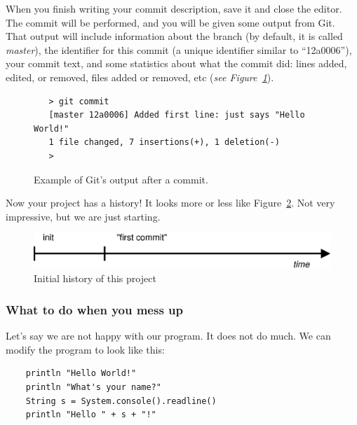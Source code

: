 When you finish writing your commit description, save it and close the
editor. The commit will be performed, and you will be given some
output from Git. That output will include information about the
branch (by default, it is called \emph{master}), the identifier for
this commit (a unique identifier similar to ``12a0006''), 
your commit text, and some 
statistics about what the commit did: lines added, edited, or removed,
files added or removed, etc (\emph{see
  Figure~\ref{fig:git-example-output}}). 

\begin{figure}[htbp!]
  \centering
  \begin{framed}
    \begin{verbatim}
   > git commit
   [master 12a0006] Added first line: just says "Hello World!"
   1 file changed, 7 insertions(+), 1 deletion(-)
   >
   \end{verbatim}
  \end{framed}
  \caption{Example of Git's output after a commit.}
  \label{fig:git-example-output}
\end{figure}

Now your project has a history! 
It looks more or less like Figure~\ref{fig:git-example-1}.
Not very impressive, but we are just starting.

\begin{figure}[htbp!]
  \centering
  \includegraphics[width=\textwidth]{gfx/commit_history_1.eps}
  \caption{Initial history of this project}
  \label{fig:git-example-1}
\end{figure}


\subsubsection*{What to do when you mess up}
\label{sec:what-do-when}

Let's say we are not happy with our program. It does not do much. We
can modify the program to look like this:

\begin{verbatim}
    println "Hello World!"
    println "What's your name?"
    String s = System.console().readline()
    println "Hello " + s + "!"
\end{verbatim}

